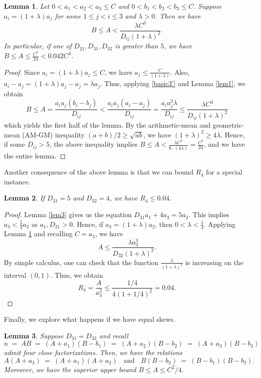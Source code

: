 \documentclass[12pt]{article}
\newtheorem{lem}{Lemma}
\begin{document}
\begin{lem} \label{lem6}
Let $0 < a_1 < a_2 < a_3 \le C$ and $0 < b_1 < b_2 < b_3 \le C$. Suppose $a_i = (1 + \lambda) a_j$ for some $1 \le j < i \le 3$ and $\lambda > 0$. Then we have
\[
B \le A < \frac{\lambda C^3}{D_{ij} (1 + \lambda)^2}.
\]
In particular, if one of $D_{21}, D_{31}, D_{32}$ is greater than $5$, we have $B \le A \le \frac{C^3}{24} < 0.042 C^3$.
\end{lem}
\begin{proof}
Since $a_i = (1 + \lambda) a_j\leq C$, we have $a_j\leq \frac{C}{(1+\lambda)}$. Also, $a_i-a_j=(1+\lambda)a_j-a_j=\lambda a_j$. 
Thus, applying \eqref{basic3'} and Lemma \ref{lem1}, we obtain
    \begin{equation*}
            B \le A = \frac{a_ia_j(b_i-b_j)}{D_{ij}} < \frac{a_i a_j (a_i-a_j)}{D_{ij}} =\frac{a_ia_j^2\lambda}{D_{ij}} \leq \frac{\lambda C^3}{D_{ij}(1+\lambda)^2}
    \end{equation*}
which yields the first half of the lemma. By the arithmetic-mean and geometric-mean (AM-GM) inequality $(a + b) / 2 \ge \sqrt{a b}$, we have $(1 + \lambda)^2 \ge 4 \lambda$. Hence, if some $D_{ij} > 5$, the above inequality implies $B \le A < \frac{\lambda C^3}{6 \cdot (4 \lambda)} = \frac{C^3}{24}$, and we have the entire lemma.
\end{proof}

Another consequence of the above lemma is that we can bound $R_4$ for a special instance.

\begin{lem} \label{lem7}
If $D_{31} = 5$ and $D_{32} = 4$, we have $R_4 \le 0.04$.
\end{lem}
\begin{proof}
Lemma \ref{lem3} gives us the equation $D_{21} a_1 + 4 a_3 = 5 a_2$. This implies $a_3 < \frac{5}{4} a_2$ as $a_1, D_{21} > 0$. Hence, if $a_3 = (1 + \lambda) a_2$, then $0 < \lambda < \frac{1}{4}$. Applying Lemma \ref{lem6} and recalling $C = a_3$, we have
\[
A \le \frac{\lambda a_3^3}{D_{32} (1 + \lambda)^2}.
\]
By simple calculus, one can check that the function $\frac{\lambda}{(1 + \lambda)^2}$ is increasing on the interval $(0, 1)$. Thus, we obtain
\[
R_4 = \frac{A}{a_3^3} \le \frac{1/4}{4 (1 + 1/4)^2} = 0.04.
\]
\end{proof}

Finally, we explore what happens if we have equal skews.

\begin{lem} \label{lem8}
Suppose $D_{31}=D_{32}$ and recall \[ n \;=\;A B
\;=\;(A+a_1)(B-b_1)
\;=\;(A+a_2)(B-b_2)
\;=\;(A+a_3)(B-b_3)
\]
admit four close factorizations. Then, we have the relations
\begin{equation} \label{AtimesA+a3}
    A (A + a_3)\;=\;(A + a_1) (A + a_2) \; \; \text{ and } \; \;  B (B - b_3)\;=\;(B - b_1) (B - b_2).
\end{equation}
Moreover, we have the superior upper bound $B \le A \le C^2 / 4$.
\end{lem}
\end{document}
